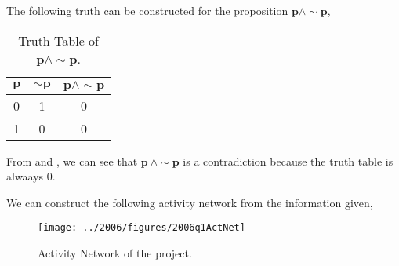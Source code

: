 \begin{subquestions}
\begin{subsubquestions}
\subsubquestion

The following truth can be constructed for the proposition $\boldsymbol{p \land \sim p}$,

\begin{table}[ht]
	\centering
	\begin{tabular}{|c|c|c|}
		\hline
		$\boldsymbol{p}$ & $\boldsymbol{\sim p}$ & $\boldsymbol{p \land \sim p}$ \\
		\hline
		0 & 1 & 0 \\
		1 & 0 & 0 \\ 
		\hline
	\end{tabular}
	\caption{\label{2006:q1:tab:TruthTab2} Truth Table of $\boldsymbol{p \land \sim p}$.}
\end{table}

From  and , we can see that $\boldsymbol{p ~\land \sim p}$ is a contradiction because the truth table is alwaays 0.

\end{subsubquestions}


\subquestion

We can construct the following activity network from the information given,
\begin{figure}[H]
	\begin{center}
		\texttt{[image: ../2006/figures/2006q1ActNet]}
		\caption{\label{2006:q1:fig:ActNet} Activity Network of the project.}
	\end{center}
\end{figure}

\end{subquestions}


